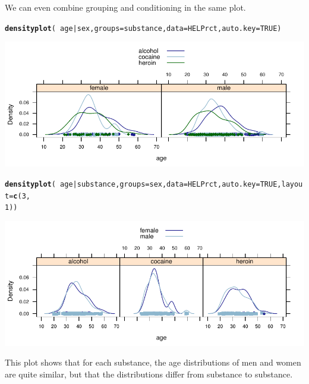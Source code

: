\documentclass[twoside]{book}\usepackage[]{graphicx}\usepackage[]{xcolor}
\makeatletter
\def\maxwidth{ %
  \ifdim\Gin@nat@width>\linewidth
    \linewidth
  \else
    \Gin@nat@width
  \fi
}
\newcommand{\hlnum}[1]{\textcolor[rgb]{0.686,0.059,0.569}{#1}}%
\newcommand{\hlopt}[1]{\textcolor[rgb]{0,0,0}{#1}}%
\newcommand{\hlstd}[1]{\textcolor[rgb]{0.345,0.345,0.345}{#1}}%
\newcommand{\hlkwc}[1]{\textcolor[rgb]{0.333,0.667,0.333}{#1}}%
\newcommand{\hlkwd}[1]{\textcolor[rgb]{0.737,0.353,0.396}{\textbf{#1}}}%
\newenvironment{kframe}{%
 \def\at@end@of@kframe{}%
 \ifinner\ifhmode%
  \def\at@end@of@kframe{\end{minipage}}%
  \begin{minipage}{\columnwidth}%
 \fi\fi%
 \def\FrameCommand##1{\hskip\@totalleftmargin \hskip-\fboxsep
 \colorbox{shadecolor}{##1}\hskip-\fboxsep
     \hskip-\linewidth \hskip-\@totalleftmargin \hskip\columnwidth}%
 \MakeFramed {\advance\hsize-\width
   \@totalleftmargin\z@ \linewidth\hsize
   \@setminipage}}%
 {\par\unskip\endMakeFramed%
 \at@end@of@kframe}
\newenvironment{knitrout}{}{} %
\makeatother
\begin{document}
We can even combine grouping and conditioning in the same plot.
\begin{knitrout}
\color{fgcolor}\begin{kframe}
\begin{alltt}
\hlkwd{densityplot}\hlstd{(}\hlopt{~}\hlstd{age} \hlopt{|} \hlstd{sex,} \hlkwc{groups} \hlstd{= substance,} \hlkwc{data} \hlstd{= HELPrct,} \hlkwc{auto.key} \hlstd{=} \hlnum{TRUE}\hlstd{)}
\end{alltt}
\end{kframe}

{\centering \includegraphics[width=\maxwidth]{figures/fig-groups-conditions-1} 

}



\end{knitrout}
\begin{knitrout}
\color{fgcolor}\begin{kframe}
\begin{alltt}
\hlkwd{densityplot}\hlstd{(}\hlopt{~}\hlstd{age} \hlopt{|} \hlstd{substance,} \hlkwc{groups} \hlstd{= sex,} \hlkwc{data} \hlstd{= HELPrct,} \hlkwc{auto.key} \hlstd{=} \hlnum{TRUE}\hlstd{,} \hlkwc{layout} \hlstd{=} \hlkwd{c}\hlstd{(}\hlnum{3}\hlstd{,}
    \hlnum{1}\hlstd{))}
\end{alltt}
\end{kframe}

{\centering \includegraphics[width=\maxwidth]{figures/fig-groups-conditions2-1} 

}



\end{knitrout}
This plot shows that for each substance, the age distributions of men and 
women are quite similar, but that the distributions differ from 
substance to substance.
\end{document}
